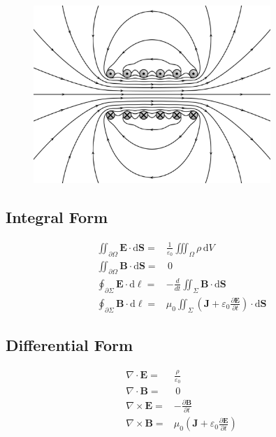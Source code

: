\documentclass[letterpaper,10pt,titlepage]{article}
\numberwithin{equation}{section}
\begin{document}
\begin{figure}[h!]
  \centering
    \includegraphics[width=0.8\textwidth,height=0.4\textheight]{maxwell.eps}
\end{figure}

\subsection*{Integral Form}

\begin{align}
  \iint_{\partial \Omega} \mathbf{E} \cdot \mathrm{d}\mathbf{S} =&
    \frac{1}{\varepsilon_0} \iiint_{\Omega} \rho\, \mathrm{d}V \\
  \iint_{\partial \Omega} \mathbf{B} \cdot \mathrm{d}\mathbf{S} =&\, 0\\
  \oint_{\partial \Sigma} \mathbf{E} \cdot \mathrm{d}\ell =&
    -\frac{d}{dt}\iint_{\Sigma}\mathbf{B} \cdot \mathrm{d}\mathbf{S} \\
  \oint_{\partial \Sigma} \mathbf{B} \cdot \mathrm{d}\ell =& \mu_0
      \iint_{\Sigma}
      \left(
        \mathbf{J} + \varepsilon_0 \frac{\partial\mathbf{E}}{\partial t}
      \right)
      \cdot \mathrm{d}\mathbf{S}
\end{align}

\subsection*{Differential Form}

\begin{align}
  \nabla \cdot \mathbf{E} =& \frac{\rho}{\varepsilon_0}\\
  \nabla \cdot \mathbf{B} =&\, 0\\
  \nabla \times \mathbf{E} =& - \frac{\partial\mathbf{B}}{\partial t}\\
  \nabla \times \mathbf{B} =& \mu_0
      \left(
        \mathbf{J} + \varepsilon_0 \frac{\partial\mathbf{E}}{\partial t}
      \right)
\end{align}
\end{document}

